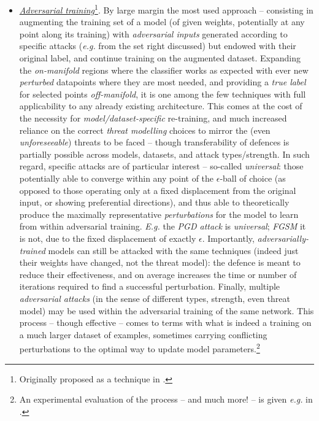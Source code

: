 \begin{itemize}
    \item \textit{\underline{Adversarial training}}\footnote{Originally proposed as a technique in \cite{Goodfellow2015Harnessing}.}. By large margin the most used approach -- consisting in augmenting the training set of a model (of given weights, potentially at any point along its training) with \textit{adversarial inputs} generated according to specific attacks (\textit{e.g.} from the set right discussed) but endowed with their original label, and continue training on the augmented dataset. Expanding the \textit{on-manifold} regions where the classifier works as expected with ever new \textit{perturbed} datapoints where they are most needed, and providing a \textit{true label} for selected points \textit{off-manifold}, it is one among the few techniques with full applicability to any already existing architecture. This comes at the cost of the necessity for \textit{model/dataset-specific} re-training, and much increased reliance on the correct \textit{threat modelling} choices to mirror the (even \textit{unforeseeable}) threats to be faced -- though transferability of defences is partially possible across models, datasets, and attack types/strength.\newline
    In such regard, specific attacks are of particular interest -- so-called \textit{universal}: those potentially able to converge within any point of the $\epsilon$-ball of choice (as opposed to those operating only at a fixed displacement from the original input, or showing preferential directions), and thus able to theoretically produce the maximally representative \textit{perturbations} for the model to learn from within adversarial training. \textit{E.g.} the \textit{PGD attack} is \textit{universal}; \textit{FGSM} it is not, due to the fixed displacement of exactly $\epsilon$.\newline
    Importantly, \textit{adversarially-trained} models can still be attacked with the same techniques (indeed just their weights have changed, not the threat model): the defence is meant to reduce their effectiveness, and on average increases the time or number of iterations required to find a successful perturbation.\newline
    Finally, multiple \textit{adversarial attacks} (in the sense of different types, strength, even threat model) may be used within the adversarial training of the same network. This process -- though effective -- comes to terms with what is indeed a training on a much larger dataset of examples, sometimes carrying conflicting perturbations \wrt to the optimal way to update model parameters.\footnote{An experimental evaluation of the process -- and much more! -- is given \textit{e.g.} in \cite{TramerBoneh2019Adversarial}.}

\end{itemize}
